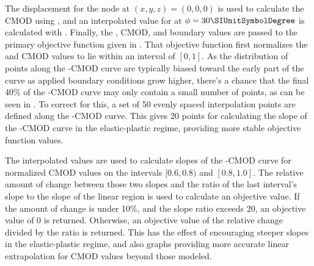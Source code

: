 The displacement for the node at \((x, y, z) = (0, 0, 0)\) is used to calculate the CMOD using , and an interpolated value for \J at \(\phi=30{\SIUnitSymbolDegree}\) is calculated with .
Finally, the \J, CMOD, and boundary values are passed to the primary objective function given in .
That objective function first normalizes the \J and CMOD values to lie within an interval of \([0, 1]\).
As the distribution of points along the \J-CMOD curve are typically biased toward the early part of the curve as applied boundary conditions grow higher, there's a chance that the final 40\% of the \J-CMOD curve may only contain a small number of points, as can be seen in .
To correct for this, a set of 50 evenly spaced interpolation points are defined along the \J-CMOD curve.
This gives 20 points for calculating the slope of the \J-CMOD curve in the elastic-plastic regime, providing more stable objective function values.

The interpolated values are used to calculate slopes of the \J-CMOD curve for normalized CMOD values on the intervals \([0.6, 0.8)\) and \([0.8, 1.0]\).
The relative amount of change between those two slopes and the ratio of the last interval's slope to the slope of the linear region is used to calculate an objective value.
If the amount of change is under 10\%, and the slope ratio exceeds 20, an objective value of 0 is returned.
Otherwise, an objective value of the relative change divided by the ratio is returned.
This has the effect of encouraging steeper slopes in the elastic-plastic regime, and also graphs providing more accurate linear extrapolation for CMOD values beyond those modeled.

